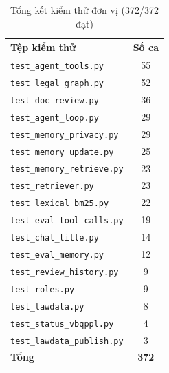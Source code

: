 \begin{table}[H]
\centering
\small
\caption{Tổng kết kiểm thử đơn vị (372/372 đạt)}
\label{tab:tong_kiemthu}
\begin{tabular}{|L{8.4cm}|c|}
\hline
\textbf{Tệp kiểm thử} & \textbf{Số ca} \\ \hline
\texttt{test\_agent\_tools.py} & 55 \\ \hline
\texttt{test\_legal\_graph.py} & 52 \\ \hline
\texttt{test\_doc\_review.py} & 36 \\ \hline
\texttt{test\_agent\_loop.py} & 29 \\ \hline
\texttt{test\_memory\_privacy.py} & 29 \\ \hline
\texttt{test\_memory\_update.py} & 25 \\ \hline
\texttt{test\_memory\_retrieve.py} & 23 \\ \hline
\texttt{test\_retriever.py} & 23 \\ \hline
\texttt{test\_lexical\_bm25.py} & 22 \\ \hline
\texttt{test\_eval\_tool\_calls.py} & 19 \\ \hline
\texttt{test\_chat\_title.py} & 14 \\ \hline
\texttt{test\_eval\_memory.py} & 12 \\ \hline
\texttt{test\_review\_history.py} & 9 \\ \hline
\texttt{test\_roles.py} & 9 \\ \hline
\texttt{test\_lawdata.py} & 8 \\ \hline
\texttt{test\_status\_vbqppl.py} & 4 \\ \hline
\texttt{test\_lawdata\_publish.py} & 3 \\ \hline
\textbf{Tổng} & \textbf{372} \\ \hline
\end{tabular}
\end{table}
